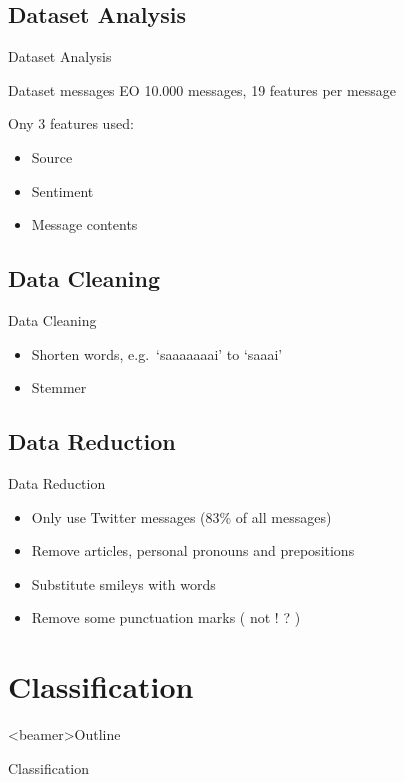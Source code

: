 \documentclass{beamer}
\begin{document}
\subsection{Dataset Analysis}
\begin{frame}{Dataset Analysis}
\begin{block}{Dataset messages EO}
10.000 messages, 19 features per message
\end{block}
Ony 3 features used: \\
\begin{itemize}
\item Source
\item Sentiment
\item Message contents
\end{itemize}
\end{frame}


\subsection{Data Cleaning}
\begin{frame}{Data Cleaning}
\begin{itemize}
\item Shorten words, e.g.\ `saaaaaaai' to `saaai'
\item Stemmer
\end{itemize}
\end{frame}

\subsection{Data Reduction}
\begin{frame}{Data Reduction}
\begin{itemize}
\item Only use Twitter messages (83\% of all messages)
\item Remove articles, personal pronouns and prepositions
\item Substitute smileys with words
\item Remove some punctuation marks ( not ! ? )
\end{itemize}
\end{frame}

\section{Classification}
\begin{frame}<beamer>{Outline}
    \setcounter{tocdepth}{2}
    \tableofcontents[
    currentsubsection, 
    hideothersubsections, 
    sectionstyle=show/hide] 
  \end{frame}
\begin{frame}{Classification}
\end{frame}
\end{document}
